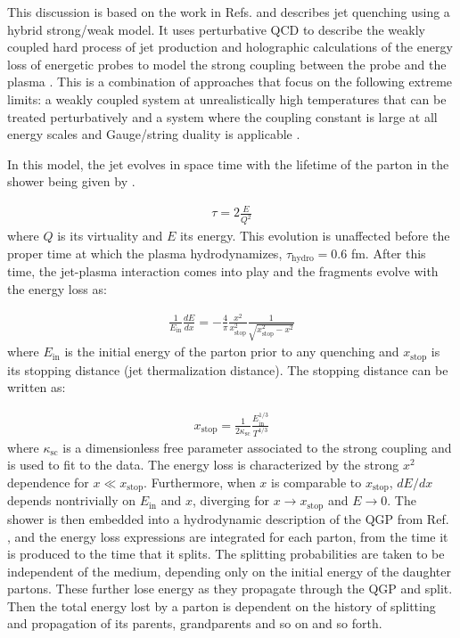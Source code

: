 
This discussion is based on the work in Refs. \cite{Casalderrey-Solana:2014bpa, Hulcher:2017cpt, Casalderrey-Solana:2016jvj} and describes jet quenching using a hybrid strong/weak model. It uses perturbative QCD to describe the weakly coupled hard process of jet production and holographic calculations of the energy loss of energetic probes to model the strong coupling between the probe and the plasma \cite{Chesler:2015nqz, Chesler:2014jva}. This is a combination of approaches that focus on the following extreme limits: a weakly coupled system at unrealistically high temperatures that can be treated perturbatively \cite{Jacobs:2004qv, Majumder:2010qh} and a system where the coupling constant is large at all energy scales and Gauge/string duality is applicable \cite{CasalderreySolana:2011us}.

In this model, the jet evolves in space time with the lifetime of the parton in the shower being given by \cite{CasalderreySolana:2011gx}.  

\begin{align}
\tau = 2 \frac{E}{Q^2}
\end{align}
where $Q$ is its virtuality and $E$ its energy. This evolution is unaffected before the proper time at which the plasma hydrodynamizes, $\tau_{\text{hydro}} = 0.6$ fm. After this time, the jet-plasma interaction comes into play and the fragments evolve with the energy loss as:

\begin{align}
\frac{1}{E_{\mathrm{in}}} \frac{dE}{dx} = -\frac{4}{\pi} \frac{x^2}{x_{\mathrm{stop}}^2} \frac{1}{\sqrt{x_{\mathrm{stop}}^2 - x^2}}
\end{align}
where $E_{\mathrm{in}}$ is the initial energy of the parton prior to any quenching and $x_{\mathrm{stop}}$ is its stopping distance (jet thermalization distance). The stopping distance can be written as:

\begin{align}
x_\mathrm{stop} = \frac{1}{2\kappa_\mathrm{sc}} \frac{E_\mathrm{in}^{1/3}}{T^{4/3}}
\end{align}
where $\kappa_\mathrm{sc}$ is a dimensionless free parameter associated to the strong coupling and is used to fit to the data. The energy loss is characterized by the strong  $x^2$ dependence for $x \ll x_\mathrm{stop}$. Furthermore, when $x$ is comparable to $x_\mathrm{stop}$, $dE/dx$ depends nontrivially on $E_\mathrm{in}$ and $x$, diverging for $x\rightarrow x_\mathrm{stop}$ and $E\rightarrow0$. The shower is then embedded into a hydrodynamic description of the QGP from Ref. \cite{Hirano:2010je}, and the energy loss expressions are integrated for each parton, from the time it is produced to the time that it splits. The splitting probabilities are taken to be independent of the medium, depending only on the initial energy of the daughter partons. These further lose energy as they propagate through the QGP and split. Then the total energy lost by a parton is dependent on the history of splitting and propagation of its parents, grandparents and so on and so forth. 


